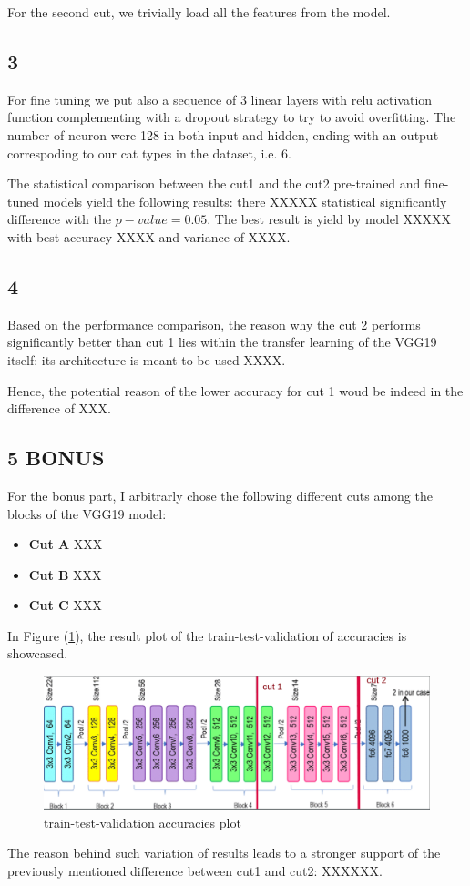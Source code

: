 \documentclass[11pt]{scrartcl}
\begin{document}
For the second cut, we trivially load all the features from the model.


\subsection*{3}

For fine tuning we put also a sequence of 3 linear layers 
with relu activation function complementing 
with a dropout strategy to try to avoid overfitting.
The number of neuron were 128 in both input and hidden, 
ending with an output correspoding to our cat types in the dataset, i.e. 6.

The statistical comparison 
between the cut1 and the cut2 pre-trained and fine-tuned models yield 
the following results:
there XXXXX statistical significantly difference with the \( p-value = 0.05 \).
The best result is yield by model XXXXX with best accuracy XXXX and variance of XXXX.


\subsection*{4}

Based on the performance comparison, 
the reason why the cut 2 performs significantly better than cut 1
lies within the transfer learning of the VGG19 itself:
its architecture is meant to be used XXXX.

Hence, the potential reason of the lower accuracy for cut 1 
woud be indeed in the difference of XXX.

\subsection*{5 BONUS}

For the bonus part, I arbitrarly chose the following different cuts among the blocks
of the VGG19 model:

\begin{itemize}
	\item \textbf{Cut A} XXX
	\item \textbf{Cut B} XXX
	\item \textbf{Cut C} XXX
\end{itemize}

In Figure (\ref{fig:task3-bonus-plot}), 
the result plot of the train-test-validation of accuracies is showcased.

\begin{figure}[th]
	\centering
	\includegraphics[scale=0.33]{cuts.png}
	\caption{train-test-validation accuracies plot}
	\label{fig:task3-bonus-plot}
\end{figure}

The reason behind such variation of results leads to a stronger 
support of the previously mentioned difference between cut1 and cut2:
XXXXXX.
\end{document}

